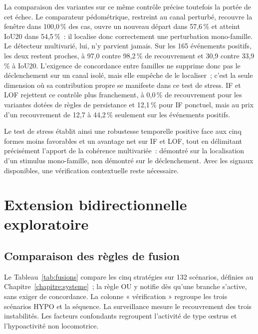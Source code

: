 La comparaison des variantes sur ce même contrôle précise toutefois la portée de cet échec.
Le comparateur pédométrique, restreint au canal perturbé, recouvre la fenêtre dans 100,0\,\%
des cas, ouvre un nouveau départ dans 57,6\,\% et atteint IoU20 dans 54,5\,\%~: il localise
donc correctement une perturbation mono-famille. Le détecteur multivarié, lui, n'y parvient
jamais. Sur les 165 événements positifs, les deux restent proches, à 97,0 contre 98,2\,\% de
recouvrement et 30,9 contre 33,9\,\% à IoU20. L'exigence de concordance entre familles ne
supprime donc pas le déclenchement sur un canal isolé, mais elle empêche de le localiser~;
c'est la seule dimension où sa contribution propre se manifeste dans ce test de stress. IF et LOF
rejettent ce contrôle plus franchement, à 0,0\,\% de recouvrement pour les variantes dotées de
règles de persistance et 12,1\,\% pour IF ponctuel, mais au prix d'un recouvrement de 12,7 à
44,2\,\% seulement sur les événements positifs.

Le test de stress établit ainsi une robustesse temporelle positive face aux cinq formes moins
favorables et un avantage net sur IF et LOF, tout en délimitant précisément l'apport de la
cohérence multivariée~: démontré sur la localisation d'un stimulus mono-famille, non démontré
sur le déclenchement. Avec les signaux disponibles, une vérification contextuelle reste
nécessaire.

\section{Extension bidirectionnelle exploratoire}
\subsection{Comparaison des règles de fusion}
Le Tableau~\ref{tab:fusions} compare les cinq stratégies sur 132 scénarios, définies au
Chapitre~\ref{chapitre:systeme}~; la règle OU y notifie dès qu'une branche s'active, sans
exiger de concordance. La colonne
« vérification » regroupe les trois scénarios HYPO et la séquence. La surveillance mesure le
recouvrement des trois instabilités. Les facteurs confondants regroupent l'activité de type
œstrus et l'hypoactivité non locomotrice.

